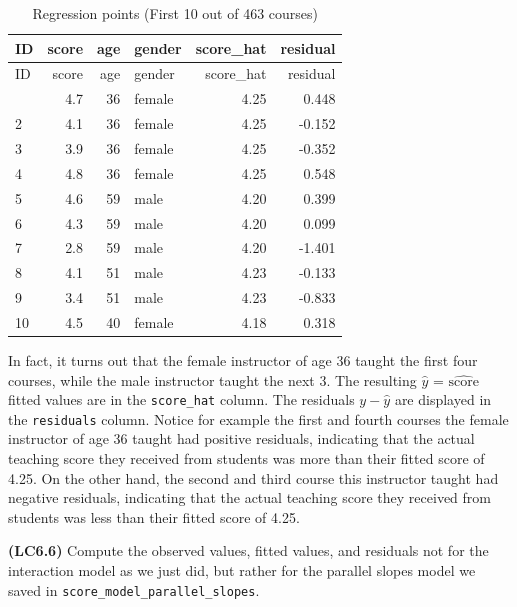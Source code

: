 \documentclass[
  letterpaper,
  DIV=11,
  numbers=noendperiod]{scrreprt}
\theoremstyle{definition}
\theoremstyle{remark}
\begin{document}
\hypertarget{tbl-model4-points-table}{}
\begin{longtable}[]{@{}lrrlrr@{}}
\caption{\label{tbl-model4-points-table}Regression points (First 10 out
of 463 courses)}\tabularnewline
\toprule\noalign{}
ID & score & age & gender & score\_hat & residual \\
\midrule\noalign{}
\endfirsthead
\toprule\noalign{}
ID & score & age & gender & score\_hat & residual \\
\midrule\noalign{}
\endhead
\bottomrule\noalign{}
\endlastfoot
1 & 4.7 & 36 & female & 4.25 & 0.448 \\
2 & 4.1 & 36 & female & 4.25 & -0.152 \\
3 & 3.9 & 36 & female & 4.25 & -0.352 \\
4 & 4.8 & 36 & female & 4.25 & 0.548 \\
5 & 4.6 & 59 & male & 4.20 & 0.399 \\
6 & 4.3 & 59 & male & 4.20 & 0.099 \\
7 & 2.8 & 59 & male & 4.20 & -1.401 \\
8 & 4.1 & 51 & male & 4.23 & -0.133 \\
9 & 3.4 & 51 & male & 4.23 & -0.833 \\
10 & 4.5 & 40 & female & 4.18 & 0.318 \\
\end{longtable}

In fact, it turns out that the female instructor of age 36 taught the
first four courses, while the male instructor taught the next 3. The
resulting \(\widehat{y}\) = \(\widehat{\text{score}}\) fitted values are
in the \texttt{score\_hat} column. The residuals \(y-\widehat{y}\) are
displayed in the \texttt{residuals} column. Notice for example the first
and fourth courses the female instructor of age 36 taught had positive
residuals, indicating that the actual teaching score they received from
students was more than their fitted score of 4.25. On the other hand,
the second and third course this instructor taught had negative
residuals, indicating that the actual teaching score they received from
students was less than their fitted score of 4.25.

\begin{tcolorbox}[enhanced jigsaw, colback=white, toprule=.15mm, bottomrule=.15mm, titlerule=0mm, title={{🎯} Learning Check 6.5}, leftrule=.75mm, arc=.35mm, left=2mm, colframe=quarto-callout-tip-color-frame, coltitle=black, opacitybacktitle=0.6, bottomtitle=1mm, colbacktitle=quarto-callout-tip-color!10!white, opacityback=0, toptitle=1mm, rightrule=.15mm, breakable]

\textbf{(LC6.6)} Compute the observed values, fitted values, and
residuals not for the interaction model as we just did, but rather for
the parallel slopes model we saved in
\texttt{score\_model\_parallel\_slopes}.

\end{tcolorbox}
\end{document}
